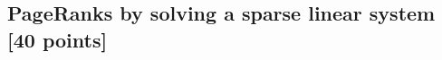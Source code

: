 \documentclass[unicode,11pt,a4paper,oneside,numbers=endperiod,openany]{scrartcl}
\begin{document}


\subsection{PageRanks by solving a sparse linear system [40 points]}
\end{document}
